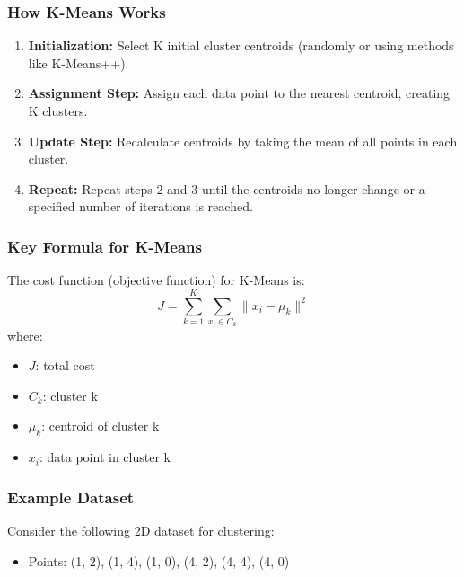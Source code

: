 \documentclass[aspectratio=169]{beamer}
\begin{document}
\begin{frame}
    \frametitle{How K-Means Works}
    \begin{enumerate}
        \item \textbf{Initialization:} Select K initial cluster centroids (randomly or using methods like K-Means++).
        \item \textbf{Assignment Step:} Assign each data point to the nearest centroid, creating K clusters.
        \item \textbf{Update Step:} Recalculate centroids by taking the mean of all points in each cluster.
        \item \textbf{Repeat:} Repeat steps 2 and 3 until the centroids no longer change or a specified number of iterations is reached.
    \end{enumerate}
\end{frame}

\begin{frame}
    \frametitle{Key Formula for K-Means}
    The cost function (objective function) for K-Means is: 
    \begin{equation}
        J = \sum_{k=1}^K \sum_{x_i \in C_k} \| x_i - \mu_k \|^2
    \end{equation}
    where:
    \begin{itemize}
        \item \( J \): total cost
        \item \( C_k \): cluster k
        \item \( \mu_k \): centroid of cluster k
        \item \( x_i \): data point in cluster k
    \end{itemize}
\end{frame}

\begin{frame}[fragile]
    \frametitle{Example Dataset}
    Consider the following 2D dataset for clustering:
    \begin{itemize}
        \item Points: (1, 2), (1, 4), (1, 0), (4, 2), (4, 4), (4, 0)
    \end{itemize}
\end{frame}
\end{document}
